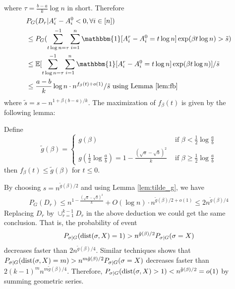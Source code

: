 \documentclass{article}
\begin{document}
where $\tau =\frac{b-a}{k}\log n$ in short. Therefore
\begin{align*}
&P_G(D_r | A_i^r - A_i^0  < 0, \forall i\in [n])  \\
&\leq P_G(\sum_{t\log n =\tau}^{-1}\sum_{i=1}^n \mathbbm{1}[A^r_i - A^0_i = t\log n]\exp ( \beta  t\log n)  > \tilde{s} ) \\
& \leq \mathbb{E}[\sum_{t\log n =\tau}^{-1}\sum_{i=1}^n \mathbbm{1}[A^r_i - A^0_i= t\log n]\exp ( \beta  t\log n)] /  \tilde{s} \\
& \leq \frac{a-b}{k}\log n \cdot n^{f_{\beta}(t) + o(1)} / \tilde{s} \textrm{ using Lemma \ref{lem:fb} }
\end{align*}
where $\tilde{s} = s - n^{1+\beta(b-a)/k}$. 
The maximization of $f_{\beta}(t)$ is given by the following lemma:
\begin{lemma}\label{lem:tilde_g}
	Define
	\begin{equation}\label{eq:gbt}
	\tilde{g}(\beta) = \begin{cases}
	g(\beta)   & \text{~if~} \beta< \frac{1}{2}\log\frac{a}{b} \\
	g(\frac{1}{2} \log\frac{a}{b}) = 1 - \frac{(\sqrt{a}-\sqrt{b})^2}{k} & \text{~if~} \beta\ge \frac{1}{2}\log\frac{a}{b}
	\end{cases}
	\end{equation}
	then $f_{\beta}(t) \leq \tilde{g}(\beta)$ for $t\leq 0$.
\end{lemma}
By choosing $s = n^{\tilde{g}(\beta)/2}$ and using Lemma \ref{lem:tilde_g}, we have
\begin{align*}
P_G( D_r) \leq  n^{1-\frac{(\sqrt{a}-\sqrt{b})^2}{k}} + O(\log n)  \cdot n^{\tilde{g}(\beta)/2 + o(1)} \leq 2n^{\tilde{g}(\beta)/4}
\end{align*}
Replacing $D_r$ by $\cup_{r=1}^{k-1} D_r$ in the above deduction we could get the same conclusion.
That is, the probability of event
$$
P_{\sigma | G}(\operatorname{dist}(\sigma, X) = 1) > n^{\tilde{g}(\beta)/2}P_{\sigma | G}(\sigma = X)\label{eq:betastar_xx}
$$
decreases faster than $2n^{\tilde{g}(\beta)/4}$.
Similar techniques shows that $P_{\sigma | G}(\operatorname{dist}(\sigma, X) = m)> n^{m\tilde{g}(\beta)/2}P_{\sigma | G}(\sigma = X)$
decreases faster than $2(k-1)^m n^{m\tilde{g}(\beta)/4}$. Therefore, $P_{\sigma | G}(\operatorname{dist}(\sigma, X) > 1) < n^{\tilde{g}(\beta)/2} = o(1)$ by summing geometric series.
\end{document}
